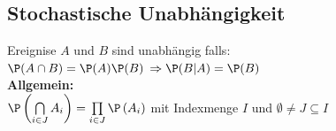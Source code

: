 \documentclass[german,color,6pt]{latex4ei/latex4ei_sheet}
\begin{document}
\begin{sectionbox}
	\subsection{Stochastische Unabhängigkeit}
	Ereignise $A$ und $B$ sind unabhängig falls:\\
	$\P(A \cap B) = \P(A)\P(B)$
	$\Rightarrow \P(B|A)=\P(B)$  \\
	\textbf{Allgemein:}  \\
	$\P\left(\bigcap\limits_{i \in J} A_i\right) = \prod\limits_{i \in J}\P\left(A_i\right)$
	mit Indexmenge $I$ und $\emptyset \neq J \subseteq I$
\end{sectionbox}

\vspace{-0.3cm}
\end{document}
